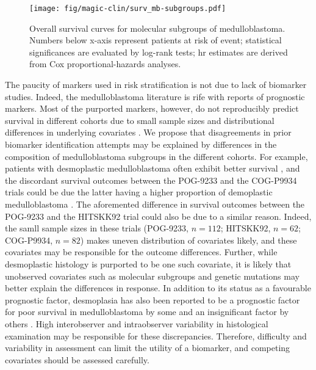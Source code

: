 \begin{SCfigure}[5][b]
	\texttt{[image: fig/magic-clin/surv\_mb-subgroups.pdf]}
	\caption[Overall survival curves for molecular subgroups of medulloblastoma]
	{
		Overall survival curves for molecular subgroups of medulloblastoma.
		Numbers below x-axis represent patients at risk of event; statistical significances are evaluated by log-rank tests; \gls{hr} estimates are derived from Cox proportional-hazards analyses.
	}
	\label{fig:surv_mb-subgroups}
\end{SCfigure}

The paucity of markers used in risk stratification is not due to lack of biomarker studies. Indeed, the medulloblastoma literature is rife with reports of prognostic markers. Most of the purported markers, however, do not reproducibly predict survival in different cohorts due to small sample sizes and distributional differences in underlying covariates . We propose that disagreements in prior biomarker identification attempts may be explained by differences in the composition of medulloblastoma subgroups in the different cohorts. For example, patients with desmoplastic medulloblastoma often exhibit better survival , and the discordant survival outcomes between the POG-9233 and the COG-P9934 trials could be due the latter having a higher proportion of demoplastic medulloblastoma . The aforemented difference in survival outcomes between the POG-9233 and the HITSKK92 trial could also be due to a similar reason. Indeed, the samll sample sizes in these trials (POG-9233, $n = 112$; HITSKK92, $n = 62 $; COG-P9934, $n = 82$) makes uneven distribution of covariates likely, and these covariates may be responsible for the outcome differences. Further, while desmoplastic histology is purported to be one such covariate, it is likely that unobserved covariates such as molecular subgroups and genetic mutations may better explain the differences in response. In addition to its status as a favourable prognostic factor, desmoplasia has also been reported to be a prognostic factor for poor survival in medulloblastoma by some  and an insignificant factor by others . High interobserver and intraobserver variability in histological examination may be responsible for these discrepancies. Therefore, difficulty and variability in assessment can limit the utility of a biomarker, and competing covariates should be assessed carefully.

